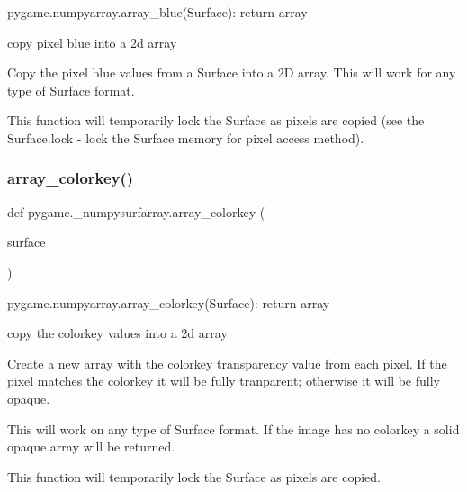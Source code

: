 \begin{DoxyVerb}pygame.numpyarray.array_blue(Surface): return array

copy pixel blue into a 2d array

Copy the pixel blue values from a Surface into a 2D array. This will work
for any type of Surface format.

This function will temporarily lock the Surface as pixels are copied
(see the Surface.lock - lock the Surface memory for pixel access
method).
\end{DoxyVerb}
 \mbox{\label{namespacepygame_1_1__numpysurfarray_adf2c05432071381051b0d4069fb53c53}} 
\subsubsection{\texorpdfstring{array\+\_\+colorkey()}{array\_colorkey()}}
{\footnotesize\ttfamily def pygame.\+\_\+numpysurfarray.\+array\+\_\+colorkey (\begin{DoxyParamCaption}\item[{}]{surface }\end{DoxyParamCaption})}

\begin{DoxyVerb}pygame.numpyarray.array_colorkey(Surface): return array

copy the colorkey values into a 2d array

Create a new array with the colorkey transparency value from each
pixel. If the pixel matches the colorkey it will be fully
tranparent; otherwise it will be fully opaque.

This will work on any type of Surface format. If the image has no
colorkey a solid opaque array will be returned.

This function will temporarily lock the Surface as pixels are
copied.
\end{DoxyVerb}
 \mbox{\label{namespacepygame_1_1__numpysurfarray_aa3d72af99d6b9a7f2a1400b8aed22e20}} 
